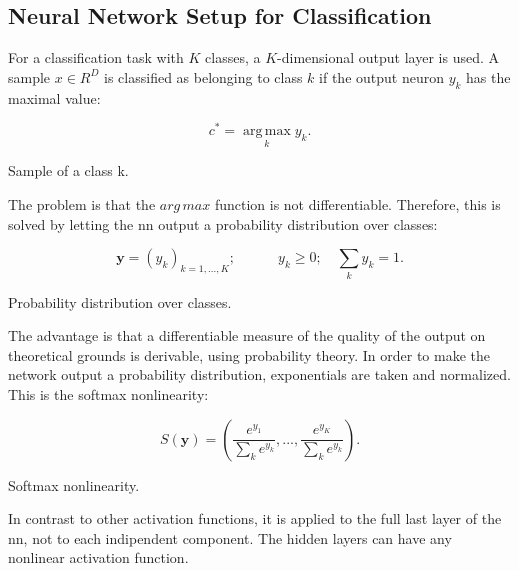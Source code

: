 \subsection{Neural Network Setup for Classification}
\label{nn:nnclassification}
For a classification task with $K$ classes, a $K$-dimensional output layer is used. A sample $x \in R^D$ is classified as belonging to class $k$ if the output neuron $y_k$ has the maximal value:

\begin{Equation}[H]
	\centering
	\begin{equation} \label{eq:nnclass}
		c^*= \operatorname*{arg\,max}_k  y_k .
	\end{equation}
	\caption[Sample of a class k.]{Sample of a class k.}
\end{Equation}

\noindent The problem is that the $arg\,max$ function is not differentiable. Therefore, this is solved by letting the \gls{nn} output a probability distribution over classes:

\begin{Equation}[H]
	\centering
	\begin{equation} \label{eq:nnclass2}
		\bm{y} = (y_k)_{k=1,...,K} ;
		\quad
		\quad
		\quad
		y_k \geq 0 ;
		\quad
		\sum_{k} y_k = 1 .
	\end{equation}
	\caption[Probability distribution over classes.]{Probability distribution over classes.}
\end{Equation}

\noindent The advantage is that a differentiable measure of the quality of the output on theoretical grounds is derivable, using probability theory. In order to make the network output a probability distribution, exponentials are taken and normalized. This is the softmax nonlinearity:

\begin{Equation}[H]
	\centering
	\begin{equation} \label{eq:softmax}
		S(\bm{y}) = \left( \frac{e^{y_1}}{\sum_k e^{y_k}},...,\frac{e^{y_K}}{\sum_k e^{y_k}} \right) .
	\end{equation}
	\caption[Softmax nonlinearity.]{Softmax nonlinearity.}
\end{Equation}

\noindent In contrast to other activation functions, it is applied to the full last layer of the \gls{nn}, not to each indipendent component. The hidden layers can have any nonlinear activation function. \\

